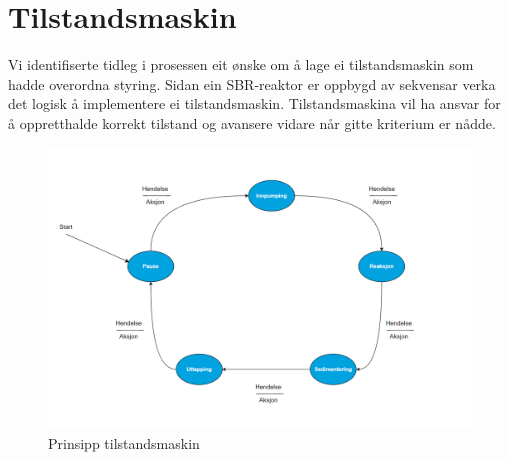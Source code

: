 \section{Tilstandsmaskin}
\thispagestyle{fancy}

Vi identifiserte tidleg i prosessen eit ønske om å lage ei tilstandsmaskin som hadde overordna styring. 
Sidan ein \gls{SBR}-reaktor er oppbygd av sekvensar verka det logisk å implementere ei tilstandsmaskin.
Tilstandsmaskina vil ha ansvar for å oppretthalde korrekt tilstand og avansere vidare når gitte kriterium er nådde. \newline \newline \newline

\begin{figure}[htbp]
    \centering
    \includegraphics[width=1\textwidth]{Figurar/Tom tilstandsmaskin.png}
    \caption{Prinsipp tilstandsmaskin }\label{fig:Tilstandsmaskin prinsipp}    
\end{figure}

\newpage

